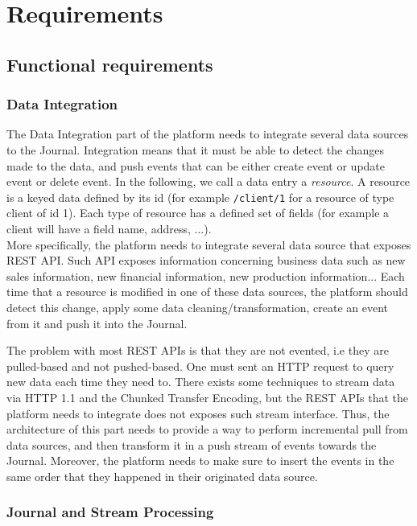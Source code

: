 \chapter{Requirements}

\section{Functional requirements}

\subsection{Data Integration}

The Data Integration part of the platform needs to integrate several data sources to the Journal. Integration means that it must be able 
to detect the changes made to the data, and push events that can be either create event or update event or delete event.
In the following, we call a data entry a \textit{resource}. A resource is a keyed data defined by its id (for example \verb|/client/1| for a
resource of type client of id 1). Each type of resource has a defined set of fields (for example a client
will have a field name, address, ...).
\\

More specifically, the platform needs to integrate several data source that exposes REST API. Such API exposes information
concerning business data such as new sales information, new financial information, new production information...
Each time that a resource is modified in one of these data sources, the platform should detect this change, apply some data cleaning/transformation, create an 
event from it and push it into the Journal.

The problem with most REST APIs is that they are not evented, i.e they are pulled-based and not pushed-based. 
One must sent an HTTP request to query new data each time they need to. There exists some techniques to stream data via HTTP 1.1 and the 
Chunked Transfer Encoding, but the REST APIs that the platform needs to integrate does not exposes such stream interface. 
Thus, the architecture of this part needs to provide a way to perform incremental pull from data sources, and then transform
it in a push stream of events towards the Journal. Moreover, the platform needs to make sure to insert the events in the same
order that they happened in their originated data source.


\subsection{Journal and Stream Processing}

